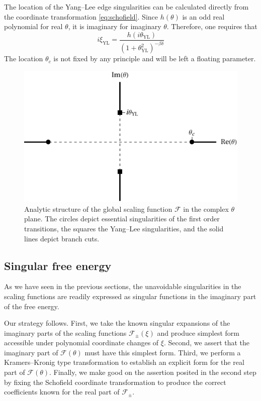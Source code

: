 \documentclass[
  aps,
  pre,
  reprint,
  longbibliography,
  floatfix
]{revtex4-2}
\begin{document}
The location of the Yang--Lee edge singularities can be calculated directly from the coordinate transformation \eqref{eq:schofield}. Since $h(\theta)$ is an odd real polynomial for real $\theta$, it is imaginary for imaginary $\theta$. Therefore, one requires that
\begin{equation}
  i\xi_{\mathrm{YL}}=\frac{h(i\theta_{\mathrm{YL}})}{(1+\theta_{\mathrm{YL}}^2)^{-\beta\delta}}
\end{equation}
The location $\theta_c$ is not fixed by any principle and will be left a floating parameter.

\begin{figure}
  \includegraphics{figs/F_theta_singularities.pdf}
  \caption{
    Analytic structure of the global scaling function $\mathcal F$ in the
    complex $\theta$ plane. The circles depict essential singularities of the
    first order transitions, the squares the Yang--Lee singularities, and the
    solid lines depict branch cuts.
  } \label{fig:schofield.singularities}
\end{figure}

\subsection{Singular free energy}

As we have seen in the previous sections, the unavoidable singularities in the
scaling functions are readily expressed as singular functions in the imaginary
part of the free energy.

Our strategy follows. First, we take the known singular expansions of the imaginary parts of the scaling functions $\mathcal F_{\pm}(\xi)$ and produce simplest form accessible under polynomial coordinate changes of $\xi$. Second, we assert that the imaginary part of $\mathcal F(\theta)$ must have this simplest form. Third, we perform a Kramers--Kronig type transformation to establish an explicit form for the real part of $\mathcal F(\theta)$. Finally, we make good on the assertion posited in the second step by fixing the Schofield coordinate transformation to produce the correct coefficients known for the real part of $\mathcal F_{\pm}$.
\end{document}
